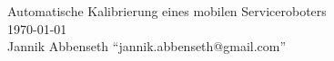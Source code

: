 %
%

\begin{titlepage}
	\vspace*{6cm}
	\begin{center}
		\Huge
		Automatische Kalibrierung eines mobilen Serviceroboters\\
		\vspace{1cm}
		\large
		\today\\
		\vspace{2cm}
		Jannik Abbenseth \enquote{jannik.abbenseth@gmail.com}\\
		
	\end{center}
	\normalsize
	
\end{titlepage}

\tableofcontents

\listoffigures

\listoftables


%
%
